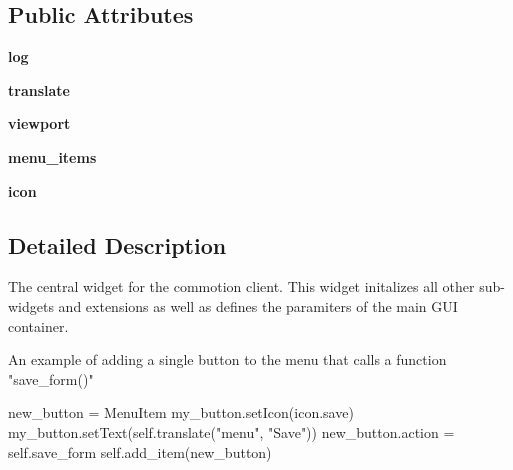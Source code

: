 \subsection*{Public Attributes}
\begin{DoxyCompactItemize}
\item 
\hypertarget{classcommotion__client_1_1GUI_1_1extension__toolbar_1_1ExtensionToolBar_a6319ad6aa6c0480e17413b5c8a018d5f}{{\bfseries log}}\label{classcommotion__client_1_1GUI_1_1extension__toolbar_1_1ExtensionToolBar_a6319ad6aa6c0480e17413b5c8a018d5f}

\item 
\hypertarget{classcommotion__client_1_1GUI_1_1extension__toolbar_1_1ExtensionToolBar_ad52b111af7587b8ed8fb2e1703f8251b}{{\bfseries translate}}\label{classcommotion__client_1_1GUI_1_1extension__toolbar_1_1ExtensionToolBar_ad52b111af7587b8ed8fb2e1703f8251b}

\item 
\hypertarget{classcommotion__client_1_1GUI_1_1extension__toolbar_1_1ExtensionToolBar_ae4fb6875e8968fb1b48a516117ee010f}{{\bfseries viewport}}\label{classcommotion__client_1_1GUI_1_1extension__toolbar_1_1ExtensionToolBar_ae4fb6875e8968fb1b48a516117ee010f}

\item 
\hypertarget{classcommotion__client_1_1GUI_1_1extension__toolbar_1_1ExtensionToolBar_a4c951281d81006ea5a1603030f4fa799}{{\bfseries menu\+\_\+items}}\label{classcommotion__client_1_1GUI_1_1extension__toolbar_1_1ExtensionToolBar_a4c951281d81006ea5a1603030f4fa799}

\item 
\hypertarget{classcommotion__client_1_1GUI_1_1extension__toolbar_1_1ExtensionToolBar_afa628724b1895e1fe4f5bd5605ead016}{{\bfseries icon}}\label{classcommotion__client_1_1GUI_1_1extension__toolbar_1_1ExtensionToolBar_afa628724b1895e1fe4f5bd5605ead016}

\end{DoxyCompactItemize}


\subsection{Detailed Description}
\begin{DoxyVerb}The central widget for the commotion client. This widget initalizes all other sub-widgets and extensions as well as defines the paramiters of the main GUI container.


An example of adding a single button to the menu that calls a function "save_form()"

new_button = MenuItem
my_button.setIcon(icon.save)
my_button.setText(self.translate("menu", "Save"))
new_button.action = self.save_form
self.add_item(new_button)\end{DoxyVerb}
 

